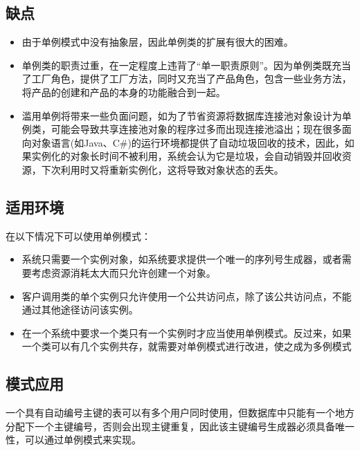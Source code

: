 \documentclass[letterpaper,10pt,english]{sphinxmanual}
\begin{document}
\subsection{缺点}
\label{\detokenize{creational_patterns/singleton:id11}}\begin{itemize}
\item {} 
\sphinxAtStartPar
由于单例模式中没有抽象层，因此单例类的扩展有很大的困难。

\item {} 
\sphinxAtStartPar
单例类的职责过重，在一定程度上违背了“单一职责原则”。因为单例类既充当了工厂角色，提供了工厂方法，同时又充当了产品角色，包含一些业务方法，将产品的创建和产品的本身的功能融合到一起。

\item {} 
\sphinxAtStartPar
滥用单例将带来一些负面问题，如为了节省资源将数据库连接池对象设计为单例类，可能会导致共享连接池对象的程序过多而出现连接池溢出；现在很多面向对象语言(如Java、C\#)的运行环境都提供了自动垃圾回收的技术，因此，如果实例化的对象长时间不被利用，系统会认为它是垃圾，会自动销毁并回收资源，下次利用时又将重新实例化，这将导致对象状态的丢失。

\end{itemize}


\subsection{适用环境}
\label{\detokenize{creational_patterns/singleton:id12}}
\sphinxAtStartPar
在以下情况下可以使用单例模式：
\begin{itemize}
\item {} 
\sphinxAtStartPar
系统只需要一个实例对象，如系统要求提供一个唯一的序列号生成器，或者需要考虑资源消耗太大而只允许创建一个对象。

\item {} 
\sphinxAtStartPar
客户调用类的单个实例只允许使用一个公共访问点，除了该公共访问点，不能通过其他途径访问该实例。

\item {} 
\sphinxAtStartPar
在一个系统中要求一个类只有一个实例时才应当使用单例模式。反过来，如果一个类可以有几个实例共存，就需要对单例模式进行改进，使之成为多例模式

\end{itemize}


\subsection{模式应用}
\label{\detokenize{creational_patterns/singleton:id13}}
\sphinxAtStartPar
一个具有自动编号主键的表可以有多个用户同时使用，但数据库中只能有一个地方分配下一个主键编号，否则会出现主键重复，因此该主键编号生成器必须具备唯一性，可以通过单例模式来实现。
\end{document}
